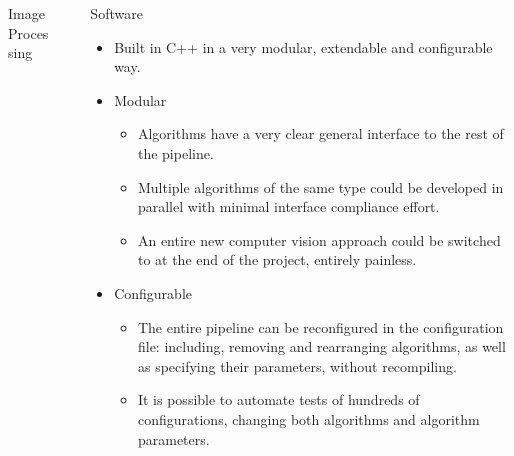 \documentclass[final,hyperref={pdfpagelabels=false}]{beamer}
\begin{document}
\begin{frame}[t]
\begin{columns}[t]
\begin{column}{.465\textwidth}
\begin{block}{Image Processing}
\end{block}



\end{column} %

\begin{column}{.03\textwidth}\end{column} %
 
\begin{column}{.465\textwidth} %






\begin{block}{Software}
\begin{itemize}
	\item Built in C++ in a very modular, extendable and configurable way.
\end{itemize}
	\begin{itemize}
		\item Modular
		\begin{itemize}
			\item Algorithms have a very clear general interface to the rest of the pipeline.
			\item Multiple algorithms of the same type could be developed in parallel with minimal interface compliance effort.
			\item An entire new computer vision approach could be switched to at the end of the project, entirely painless.
		\end{itemize}
	\end{itemize}
	\begin{itemize}
		\item Configurable
	\begin{itemize}
		\item The entire pipeline can be reconfigured in the configuration file: including, removing and rearranging algorithms, as well as specifying their parameters, without recompiling.
		\item It is possible to automate tests of hundreds of configurations, changing both algorithms and algorithm parameters.
	\end{itemize}
\end{itemize}
\end{block}


\end{column}
\end{columns}
\end{frame}
\end{document}
